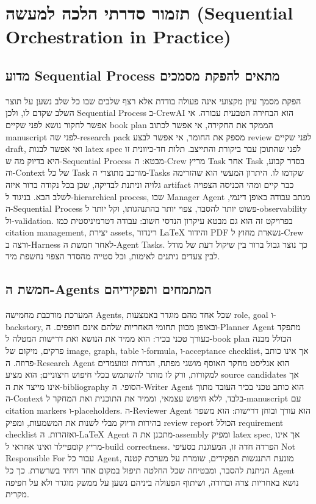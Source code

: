 \chapter{תזמור סדרתי הלכה למעשה (Sequential Orchestration in Practice)}
\section{מדוע Sequential Process מתאים להפקת מסמכים}
הפקת מסמך עיון מקצועי אינה פעולה בודדת אלא רצף שלבים שבו כל שלב נשען על תוצר השלב שקדם לו, ולכן Sequential Process ב-CrewAI הוא הבחירה הטבעית עבורה. אי אפשר לחקור נושא לפני שקיים book plan הממקד את החקירה, אי אפשר לכתוב manuscript לפני שה-research pack מספק את החומר, אי אפשר לבצע review לפני שקיים draft, ואי אפשר לבנות latex spec לפני שהתוכן עבר ביקורת והתייצב. תלות חד-כיוונית זו היא בדיוק מה ש-Sequential Process מבטא: ה-Crew מריץ Task אחר Task בסדר קבוע, וה-Context של כל Task מורכב מתוצרי ה-Tasks שקדמו לו. היתרון המעשי הוא שהזרימה גלויה וניתנת לבדיקה, שכן בכל נקודה ברור איזה artifact כבר קיים ומהי הכניסה הצפויה לשלב הבא. בניגוד ל-hierarchical process, שבו Manager Agent מנתב עבודה באופן דינמי, ה-Sequential Process פשוט יותר להסבר, צפוי יותר בהתנהגותו, וקל יותר ל-observability ול-validation. בפרויקט זה הוא גם מבטא עיקרון הנדסי חשוב: עבודה דטרמיניסטית כמו citation management, יצירת assets, רינדור LaTeX והידור PDF נשארת מחוץ ל-Crew ורצה ב-Harness לאחר חמשת ה-Agent Tasks. כך נוצר גבול ברור בין שיקול דעת של מודל לבין צעדים ניתנים לאימות, וכל סטייה מהסדר הצפוי נחשפת מיד.

\section{חמשת ה-Agents המתמחים ותפקידיהם}
המערכת מורכבת מחמישה Agents, שכל אחד מהם מוגדר באמצעות role, goal ו-backstory, ובאופן מכוון תחומי האחריות שלהם אינם חופפים. ה-Planner Agent מתפקד כעורך טכני בכיר: הוא ממיר את הנושא ואת דרישות המטלה ל-book plan הכולל מבנה פרקים, מיקום של image, graph, table ו-formula, ו-acceptance checklist, אך אינו כותב פרוזה. ה-Research Agent הוא אנליסט מחקר האוסף מושגי מפתח, הגדרות ומועמדים למקורות, ורק לו מותר להשתמש בכלי חיפוש חיצוניים; הוא מציע source candidates אך אינו מייצר את ה-bibliography הסופי. ה-Writer Agent הוא כותב טכני בכיר העובד מתוך ה-Context בלבד, ללא חיפוש עצמאי, וממיר את התוכנית ואת המחקר ל-manuscript עם citation markers ו-placeholders. ה-Reviewer Agent הוא עורך ובוחן דרישות: הוא משפר בהירות ודיוק מבלי לשנות את המשמעות, ומפיק review report הכולל requirement checklist ואזהרות. ה-LaTeX Agent מתכנן את ה-assembly ומפיק latex spec, אך אינו מריץ קומפיילר ואינו אחראי ל-build correctness. הפרדה חדה זו, המעוגנת בסעיפי Not Responsible For עבור כל Agent, מונעת התנגשות תפקידים, שומרת על מערכת קטנה הניתנת להסבר, ומבטיחה שכל החלטה תיפול במקום אחד ויחיד בשרשרת. כך כל Agent נושא באחריות צרה וברורה, ושיתוף הפעולה ביניהם נשען על ממשק מוגדר ולא על חפיפה מקרית.

